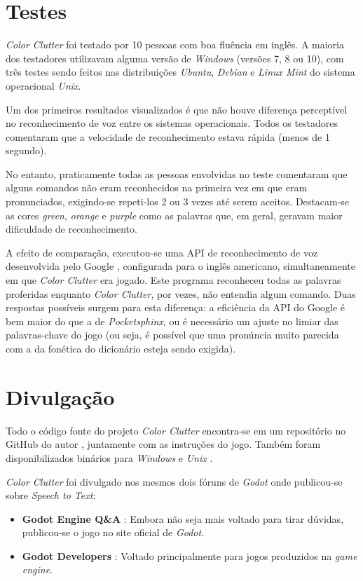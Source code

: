 
\section{Testes}

\textit{Color Clutter} foi testado por 10 pessoas com boa fluência em inglês. A maioria dos testadores utilizavam alguma versão de \textit{Windows} (versões 7, 8 ou 10), com três testes sendo feitos nas distribuições \textit{Ubuntu}, \textit{Debian} e \textit{Linux Mint} do sistema operacional \textit{Unix}.

Um dos primeiros resultados visualizados é que não houve diferença perceptível no reconhecimento de voz entre os sistemas operacionais. Todos os testadores comentaram que a velocidade de reconhecimento estava rápida (menos de 1 segundo).

No entanto, praticamente todas as pessoas envolvidas no teste comentaram que alguns comandos não eram reconhecidos na primeira vez em que eram pronunciados, exigindo-se repeti-los 2 ou 3 vezes até serem aceitos. Destacam-se as cores \textit{green}, \textit{orange} e \textit{purple} como as palavras que, em geral, geravam maior dificuldade de reconhecimento.

A efeito de comparação, executou-se uma API de reconhecimento de voz desenvolvida pelo Google \citep{googleSpeechAPI}, configurada para o inglês americano, simultaneamente em que \textit{Color Clutter} era jogado. Este programa reconheceu todas as palavras proferidas enquanto \textit{Color Clutter}, por vezes, não entendia algum comando. Duas respostas possíveis surgem para esta diferença: a eficiência da API do Google é bem maior do que a de \textit{Pocketsphinx}, ou é necessário um ajuste no limiar das palavras-chave do jogo (ou seja, é possível que uma pronúncia muito parecida com a da fonética do dicionário esteja sendo exigida).


\section{Divulgação}

Todo o código fonte do projeto \textit{Color Clutter} encontra-se em um repositório no GitHub do autor \citep{colorClutterGitHub}, juntamente com as instruções do jogo. Também foram disponibilizados binários para \textit{Windows} e \textit{Unix} \citep{colorClutterDownload}.

\textit{Color Clutter} foi divulgado nos mesmos dois fóruns de \textit{Godot} onde publicou-se sobre \textit{Speech to Text}:

\begin{itemize}
\item \textbf{Godot Engine Q\&A} \citep{colorClutterGodotQA}: Embora não seja mais voltado para tirar dúvidas, publicou-se o jogo no site oficial de \textit{Godot}.

\item \textbf{Godot Developers} \citep{colorClutterGodotDevelopers}: Voltado principalmente para jogos produzidos na \textit{game engine}.
\end{itemize}
